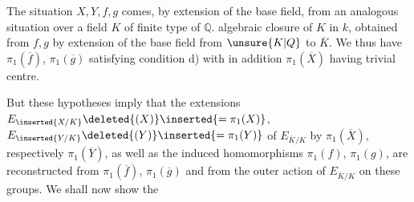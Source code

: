 
The situation $X,Y,f,g$ comes, by extension of the base field, from an analogous situation over a field $K$  of finite type of $\mathbb Q$.   algebraic closure  of $K$ in $k$,   obtained from  $f,g$ by extension of the base field from $\unsure{K|Q}$ to $\overline K$. We thus have $\pi_1(\overline f)$, $\pi_1(\overline g)$ satisfying condition d) with in addition $\pi_1(\overline X)$ having trivial centre.

But these hypotheses imply that the extensions $E_{\inserted{X/K}}\deleted{(X)}\inserted{=\pi_1(X)}$, $E_{\inserted{Y/K}}\deleted{(Y)}\inserted{=\pi_1(Y)}$ of $E_{\overline K/K}$ by $\pi_1(\overline X)$, respectively $\pi_1(\overline Y)$, as well as the induced homomorphisms $\pi_1(f)$, $\pi_1(g)$, are reconstructed from  $\pi_1(\overline f)$, $\pi_1(\overline g)$ and from the outer action of $E_{\overline K/K}$ on these groups. We shall now show the
